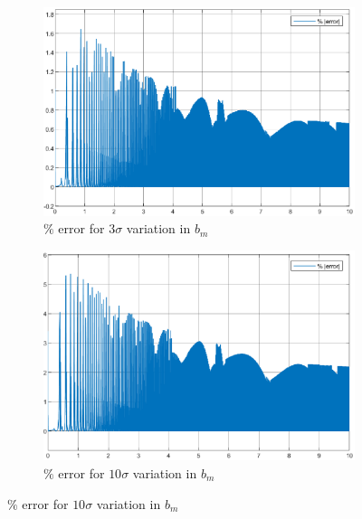 \begin{figure}[H]
\begin{minipage}{0.49\textwidth}
    \begin{figure}[H]
        \includegraphics[width = \textwidth]{figs/par_var/3_sig_bm.eps}
        \caption{$\%$ error for $3 \sigma$ variation in $b_m$}
    \end{figure}
\end{minipage}
\begin{minipage}{0.49\textwidth}
    \begin{figure}[H]
        \includegraphics[width = \textwidth]{figs/par_var/10_sig_bm.eps}
        \caption{$\%$ error for $10 \sigma$ variation in $b_m$}
    \end{figure}
\end{minipage}
\end{figure}

